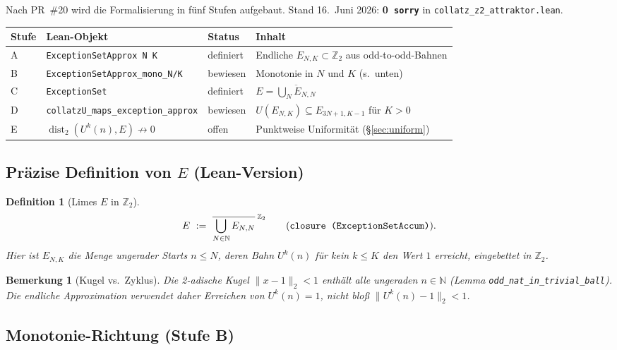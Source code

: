 \documentclass[12pt,a4paper]{article}
\newtheorem{definition}[satz]{Definition}
\newtheorem{bemerkung}[satz]{Bemerkung}
\newcommand{\N}{\mathbb{N}}
\newcommand{\Ztwo}{\mathbb{Z}_2}
\newcommand{\disttwo}{\operatorname{dist}_2}
\begin{document}
Nach PR~\#20 wird die Formalisierung in f\"unf Stufen aufgebaut.
Stand 16.\ Juni 2026: \textbf{0~\texttt{sorry}} in \texttt{collatz\_z2\_attraktor.lean}.

\begin{center}
\begin{tabular}{@{}lllp{5.5cm}@{}}
\toprule
Stufe & Lean-Objekt & Status & Inhalt \\
\midrule
A & \texttt{ExceptionSetApprox N K} & \textcolor{bewiesengruen}{definiert} &
  Endliche $E_{N,K}\subset\Ztwo$ aus odd-to-odd-Bahnen \\
B & \texttt{ExceptionSetApprox\_mono\_N/K} & \textcolor{bewiesengruen}{bewiesen} &
  Monotonie in $N$ und $K$ (s.\ unten) \\
C & \texttt{ExceptionSet} & \textcolor{bewiesengruen}{definiert} &
  $E=\overline{\bigcup_N E_{N,N}}$ \\
D & \texttt{collatzU\_maps\_exception\_approx} & \textcolor{bewiesengruen}{bewiesen} &
  $U(E_{N,K})\subseteq E_{3N+1,K-1}$ f\"ur $K>0$ \\
E & $\disttwo(U^k(n),E)\not\to 0$ & \textcolor{lueckenrot}{offen} &
  Punktweise Uniformit\"at (\S\ref{sec:uniform}) \\
\bottomrule
\end{tabular}
\end{center}

\subsection{Pr\"azise Definition von $E$ (Lean-Version)}

\begin{definition}[Limes $E$ in $\Ztwo$]
\label{def:E-lean}
\[
  E\ :=\ \overline{\bigcup_{N\in\N} E_{N,N}}^{\;\Ztwo}
  \qquad\text{(\texttt{closure (ExceptionSetAccum)}).}
\]
Hier ist $E_{N,K}$ die Menge ungerader Starts $n\leq N$, deren Bahn
$U^k(n)$ f\"ur kein $k\leq K$ den Wert $1$ erreicht, eingebettet in $\Ztwo$.
\end{definition}

\begin{bemerkung}[Kugel vs.\ Zyklus]
Die 2-adische Kugel $\|x-1\|_2<1$ enth\"alt \emph{alle} ungeraden $n\in\N$
(Lemma \texttt{odd\_nat\_in\_trivial\_ball}). Die endliche Approximation verwendet
daher Erreichen von $U^k(n)=1$, nicht blo\ss{} $\|U^k(n)-1\|_2<1$.
\end{bemerkung}

\subsection{Monotonie-Richtung (Stufe B)}
\end{document}
